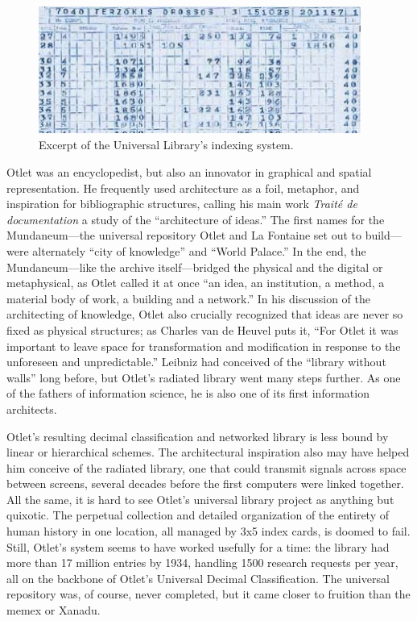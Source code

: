 \begin{figure}[ht]
\centering
\includegraphics[width=300pt]{figures/otlet}
\caption{Excerpt of the Universal Library's indexing system.}
\label{fig:otlet}
\end{figure}

Otlet was an encyclopedist, but also an innovator in graphical and spatial representation. He frequently used architecture as a foil, metaphor, and inspiration for bibliographic structures, calling his main work \emph{Trait\'{e} de documentation} a study of the ``architecture of ideas.''\autocite[129]{van_de_heuvel_building_2008} The first names for the Mundaneum---the universal repository Otlet and La Fontaine set out to build---were alternately ``city of knowledge'' and ``World Palace.'' In the end, the Mundaneum---like the archive itself---bridged the physical and the digital or metaphysical, as Otlet called it at once ``an idea, an institution, a method, a material body of work, a building and a network.''\autocite[130]{van_de_heuvel_building_2008} In his discussion of the architecting of knowledge, Otlet also crucially recognized that ideas are never so fixed as physical structures; as Charles van de Heuvel puts it, ``For Otlet it was important to leave space for transformation and modification in response to the unforeseen and unpredictable.''\autocite[131]{van_de_heuvel_building_2008} Leibniz had conceived of the ``library without walls'' long before, but Otlet's radiated library went many steps further. As one of the fathers of information science, he is also one of its first information architects.

Otlet's resulting decimal classification and networked library is less bound by linear or hierarchical schemes. The architectural inspiration also may have helped him conceive of the radiated library, one that could transmit signals across space between screens, several decades before the first computers were linked together. All the same, it is hard to see Otlet's universal library project as anything but quixotic. The perpetual collection and detailed organization of the entirety of human history in one location, all managed by 3x5 index cards, is doomed to fail. Still, Otlet's system seems to have worked usefully for a time: the library had more than 17 million entries by 1934, handling 1500 research requests per year, all on the backbone of Otlet's Universal Decimal Classification.\autocite{_limited_2001} The universal repository was, of course, never completed, but it came closer to fruition than the memex or Xanadu.

